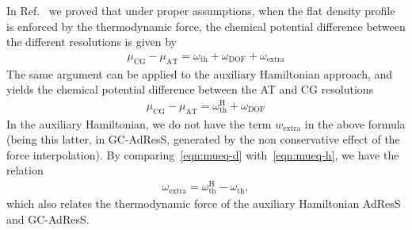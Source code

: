 \documentclass[a4paper,preprint,unsortedaddress]{revtex4-1}
\newcommand{\dof}{{\textrm{DOF}}}
\newcommand{\AT}{{\textrm{{AT}}}}
\newcommand{\CG}{{\textrm{CG}}}
\newcommand{\thf}{{\textrm{th}}}
\newcommand{\ext}{{\textrm{extra}}}
\newcommand{\hadress}{{\textrm{H}}}
\begin{document}
{In Ref.~\cite{prx} we proved that under proper assumptions,
when the flat density profile is enforced by the thermodynamic force,
the chemical potential difference between the different resolutions
is given by
\begin{align}\label{eqn:mueq-d}
 \mu_\CG - \mu_\AT =   \omega_\thf + \omega_\dof + \omega_\ext
\end{align}
The same argument can be applied to the auxiliary Hamiltonian approach,
and yields  the chemical potential difference between the AT and CG resolutions
\begin{align}\label{eqn:mueq-h}
 \mu_\CG - \mu_\AT =   \omega^\hadress_\thf + \omega_\dof 
\end{align}
In the auxiliary Hamiltonian, we do not have the term $w_\ext$ in the above
formula (being this latter, in GC-AdResS, generated by the non conservative effect of the force interpolation).
By comparing~\eqref{eqn:mueq-d} with~\eqref{eqn:mueq-h}, we have the
relation
\begin{align}\label{eqn:hd-rel-2}
  \omega_\ext = \omega^\hadress_\thf - \omega_\thf,
\end{align}
which also relates the thermodynamic force of the auxiliary Hamiltonian AdResS
and GC-AdResS.\\


}
\end{document}
